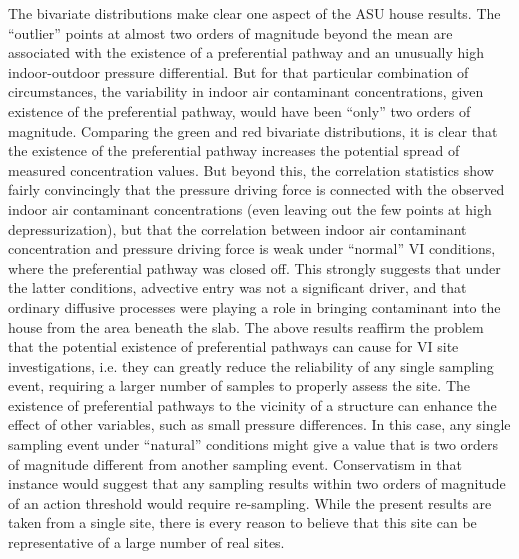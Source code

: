 \documentclass[journal=esthag,manuscript=article]{achemso}
\begin{document}
The bivariate distributions make clear one aspect of the ASU house results.
The “outlier” points at almost two orders of magnitude beyond the mean are associated with the existence of a preferential pathway and an unusually high indoor-outdoor pressure differential.
But for that particular combination of circumstances, the variability in indoor air contaminant concentrations, given existence of the preferential pathway, would have been “only” two orders of magnitude.
Comparing the green and red bivariate distributions, it is clear that the existence of the preferential pathway increases the potential spread of measured concentration values.
But beyond this, the correlation statistics show fairly convincingly that the pressure driving force is connected with the observed indoor air contaminant concentrations (even leaving out the few points at high depressurization), but that the correlation between indoor air contaminant concentration and pressure driving force is weak under “normal” VI conditions, where the preferential pathway was closed off.
This strongly suggests that under the latter conditions, advective entry was not a significant driver, and that ordinary diffusive processes were playing a role in bringing contaminant into the house from the area beneath the slab.
The above results reaffirm the problem that the potential existence of preferential pathways can cause for VI site investigations, i.e. they can greatly reduce the reliability of any single sampling event, requiring a larger number of samples to properly assess the site.
The existence of preferential pathways to the vicinity of a structure can enhance the effect of other variables, such as small pressure differences.
In this case, any single sampling event under “natural” conditions might give a value that is two orders of magnitude different from another sampling event.
Conservatism in that instance would suggest that any sampling results within two orders of magnitude of an action threshold would require re-sampling.
While the present results are taken from a single site, there is every reason to believe that this site can be representative of a large number of real sites.
\end{document}
